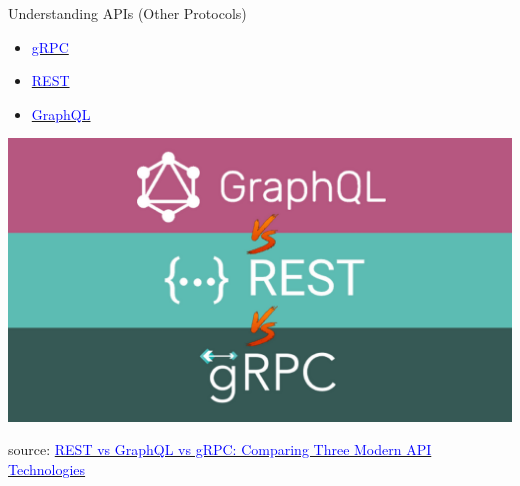 \documentclass{beamer}
\begin{document}
\begin{frame}[fragile,t, label=api-graphs]{Understanding APIs \small (Other Protocols)}
  
  \begin{minipage}[t]{0.2\textwidth}
    \begin{itemize}
      \item \href{https://grpc.io}{\textcolor{blue}{gRPC}}
      \item \href{https://en.wikipedia.org/wiki/REST}{\textcolor{blue}{REST}}
      \item \href{https://graphql.org}{\textcolor{blue}{GraphQL}} 
    \end{itemize}
  \end{minipage}
  \hfill
  \begin{minipage}[]{0.7\textwidth}
    \begin{center}
      \includegraphics[width=\textwidth, height=0.6\textheight]{img/api-protocols.png}
    \end{center}
  \end{minipage}
  
  \vspace{15mm}
      \tiny { source: \href{https://mobilelive.medium.com/rest-vs-graphql-vs-grpc-comparing-three-modern-api-technologies-9ba58abadd82}{\textcolor{blue}{REST vs GraphQL vs gRPC: Comparing Three Modern API Technologies}}}

\end{frame}
\end{document}
